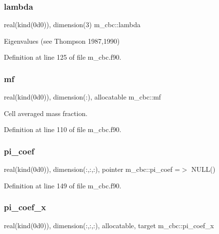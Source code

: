 \subsubsection{\texorpdfstring{lambda}{lambda}}
{\footnotesize\ttfamily real(kind(0d0)), dimension(3) m\+\_\+cbc\+::lambda}



Eigenvalues (see Thompson 1987,1990) 



Definition at line 125 of file m\+\_\+cbc.\+f90.

\mbox{\label{namespacem__cbc_a4f6b082aae7f83fcad04d8c5d59f6d89}} 
\subsubsection{\texorpdfstring{mf}{mf}}
{\footnotesize\ttfamily real(kind(0d0)), dimension(\+:), allocatable m\+\_\+cbc\+::mf}



Cell averaged mass fraction. 



Definition at line 110 of file m\+\_\+cbc.\+f90.

\mbox{\label{namespacem__cbc_ace0392bdc9bb94c00e11d4e51432e0ad}} 
\subsubsection{\texorpdfstring{pi\+\_\+coef}{pi\_coef}}
{\footnotesize\ttfamily real(kind(0d0)), dimension(\+:,\+:,\+:), pointer m\+\_\+cbc\+::pi\+\_\+coef =$>$ N\+U\+LL()}



Definition at line 149 of file m\+\_\+cbc.\+f90.

\mbox{\label{namespacem__cbc_a906043af9a1ee38feda508ccb40c5402}} 
\subsubsection{\texorpdfstring{pi\+\_\+coef\+\_\+x}{pi\_coef\_x}}
{\footnotesize\ttfamily real(kind(0d0)), dimension(\+:,\+:,\+:), allocatable, target m\+\_\+cbc\+::pi\+\_\+coef\+\_\+x}



